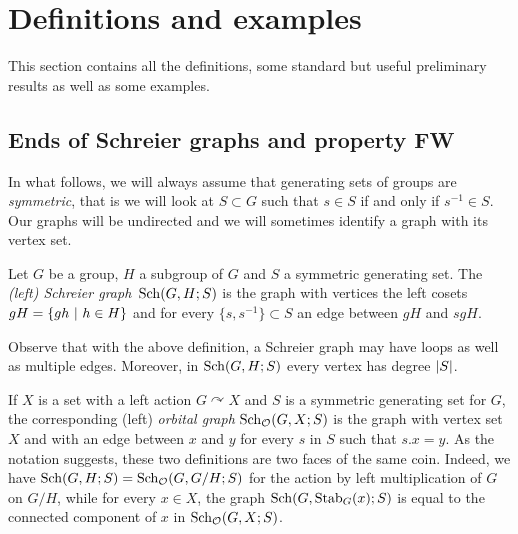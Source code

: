 %
%
%
%
%
%
%
%
%
%
\section{Definitions and examples}


This section contains all the definitions, some standard but useful preliminary results as well as some examples.
%
%
%
%
%
%
%
%
%
%
\subsection{Ends of Schreier graphs and property FW}
\label{Subsection:FW}
%
%
%
%
%
In what follows, we will always assume that generating sets of groups are \emph{symmetric}, that is we will look at $S\subset G$ such that $s\in S$ if and only if $s^{-1}\in S$.
Our graphs will be undirected and we will sometimes identify a graph with its vertex set.
%
%
\begin{defn}
Let $G$ be a group, $H$ a subgroup of $G$ and $S$ a symmetric generating set. The \emph{(left) Schreier graph} $\operatorname{Sch}(G,H;S)$ is the graph with vertices the left cosets $gH=\{gh\ |\ h\in H\}$ and for every $\{s,s^{-1}\}\subset S$ an edge between $gH$ and $sgH$.%
\end{defn}
%
%
Observe that with the above definition, a Schreier graph may have loops as well as multiple edges. Moreover, in $\operatorname{Sch}(G,H;S)$ every vertex has degree $\lvert S\rvert$.

If $X$ is a set with a left action $G\curvearrowright X$ and $S$ is a symmetric generating set for $G$, the corresponding (left) \emph{orbital graph} $\operatorname{Sch}_{\mathcal O}(G,X;S)$ is the graph with vertex set $X$ and with an edge between $x$ and $y$ for every $s$ in $S$ such that $s.x=y$.
As the notation suggests, these two definitions are two faces of the same coin. Indeed, we have $\operatorname{Sch}(G,H;S)=\operatorname{Sch}_{\mathcal O}(G,G/H;S)$ for the  action by left multiplication of $G$ on $G/H$, while   for every $x\in X$, the graph $\operatorname{Sch}(G,\operatorname{Stab}_G(x);S)$ is equal to the connected component of $x$ in $\operatorname{Sch}_{\mathcal O}(G,X;S)$.

